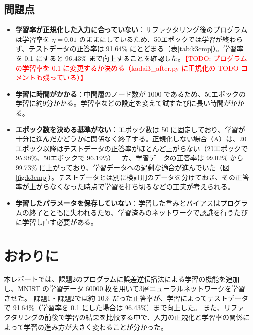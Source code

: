 \documentclass[a4paper,11pt]{ltjsarticle}
\newcommand{\todo}[1]{\textcolor{red}{【TODO: #1】}}
\begin{document}
\subsection{問題点}
\begin{itemize}
  \item \textbf{学習率が正規化した入力に合っていない}：リファクタリング後のプログラムは学習率を $\eta = 0.01$ のままにしているため、50エポックでは学習が終わらず、テストデータの正答率は 91.64\% にとどまる（表\ref{tab:k3cmp}）。学習率を 0.1 にすると 96.43\% まで向上することを確認した。\todo{プログラムの学習率を 0.1 に変更するか決める（kadai3\_after.py に正規化の TODO コメントも残っている）}
  \item \textbf{学習に時間がかかる}：中間層のノード数が 1000 であるため、50エポックの学習に約9分かかる。学習率などの設定を変えて試すたびに長い時間がかかる。
  \item \textbf{エポック数を決める基準がない}：エポック数は 50 に固定しており、学習が十分に進んだかどうかに関係なく終了する。正規化しない場合（A）は、20エポック以降はテストデータの正答率がほとんど上がらない（20エポックで 95.98\%、50エポックで 96.19\%）一方、学習データの正答率は 99.02\% から 99.73\% に上がっており、学習データへの過剰な適合が進んでいた（図\ref{fig:k3cmp}）。テストデータとは別に検証用のデータを分けておき、その正答率が上がらなくなった時点で学習を打ち切るなどの工夫が考えられる。
  \item \textbf{学習したパラメータを保存していない}：学習した重みとバイアスはプログラムの終了とともに失われるため、学習済みのネットワークで認識を行うたびに学習し直す必要がある。
\end{itemize}

\section{おわりに}
本レポートでは、課題2のプログラムに誤差逆伝播法による学習の機能を追加し、MNIST の学習データ 60000 枚を用いて3層ニューラルネットワークを学習させた。
課題1・課題2では約 10\% だった正答率が、学習によってテストデータで 91.64\%（学習率を 0.1 にした場合は 96.43\%）まで向上した。
また、リファクタリングの前後で学習の結果を比較する中で、入力の正規化と学習率の関係によって学習の進み方が大きく変わることが分かった。
\end{document}
